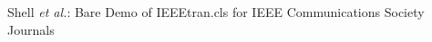 \documentclass[journal,comsoc]{IEEEtran}
\renewcommand{\^}{\hat}  %
\begin{document}
%
{Shell \MakeLowercase{\textit{et al.}}: Bare Demo of IEEEtran.cls for IEEE Communications Society Journals}
%











\maketitle
\end{document}

